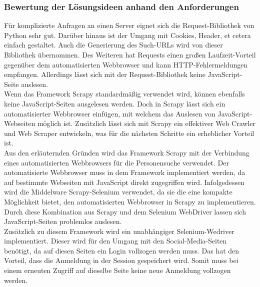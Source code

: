 			\subsubsection{Bewertung der Lösungsideen anhand den Anforderungen}
				Für komplizierte Anfragen an einen Server eignet sich die Request-Bibliothek von Python sehr gut. Darüber hinaus ist der Umgang mit Cookies, Header, et cetera  einfach gestaltet. Auch die Generierung des Such-URLs wird von dieser Bibliothek übernommen. Des Weiteren hat Requests einen großen Laufzeit-Vorteil gegenüber dem automatisierten Webbrowser und kann HTTP-Fehlermeldungen empfangen. Allerdings lässt sich mit der Request-Bibliothek keine JavaScript-Seite auslesen.\\
				Wenn das Framework Scrapy standardmäßig verwendet wird, können ebenfalls keine JavaScript-Seiten ausgelesen werden. Doch in Scrapy lässt sich ein automatisierter Webbrowser einfügen, mit welchem das Auslesen von JavaScript-Webseiten möglich ist. Zusätzlich lässt sich mit Scrapy ein effektiver Web Crawler und Web Scraper entwickeln, was für die nächsten Schritte ein erheblicher Vorteil ist.\\
				Aus den erläuternden Gründen wird das Framework Scrapy mit der Verbindung eines automatisierten Webbrowsers für die Personensuche verwendet. Der automatisierte Webbrowser muss in dem Framework implementiert werden, da auf bestimmte Webseiten mit JavaScript direkt zugegriffen wird. Infolgedessen wird die Middelware Scrapy-Selenium verwendet, da sie die eine kompakte Möglichkeit bietet, den automatisierten Webbrowser in Scrapy zu implementieren. Durch diese Kombination aus Scrapy und dem Selenium WebDriver lassen sich JavaScript-Seiten problemlos auslesen. \\
				Zusätzlich zu diesem Framework wird ein unabhängiger Selenium-Wedriver implementiert. Dieser wird für den Umgang mit den Social-Media-Seiten benötigt, da auf diesen Seiten ein Login vollzogen werden muss. Das hat den Vorteil, dass die Anmeldung in der Session gespeichert wird. Somit muss bei einem erneuten Zugriff auf dieselbe Seite keine neue Anmeldung vollzogen werden.
	
